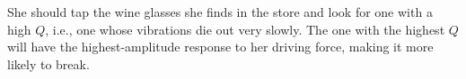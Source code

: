 She should tap the wine glasses she finds in the store and look for one with
a high $Q$, i.e., one whose vibrations die out very slowly. The one with the
highest $Q$ will have the highest-amplitude response to her driving force,
making it more likely to break.



